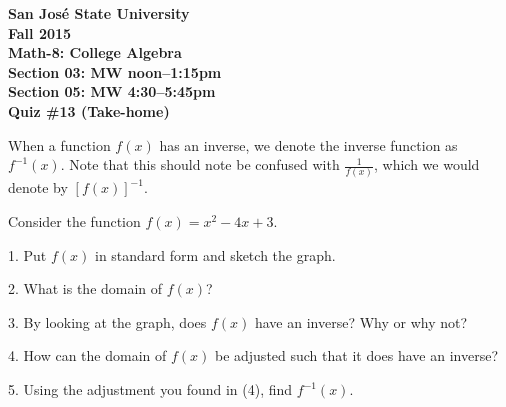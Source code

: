 \documentclass[letterpaper, 12pt]{article}
\begin{document}
\begin{center}
\bfseries
San Jos\'{e} State University \\
Fall 2015 \\
Math-8: College Algebra \\
Section 03: MW noon--1:15pm \\
Section 05: MW 4:30--5:45pm \\
\bigskip
Quiz \#13 (Take-home)
\end{center}

\bigskip

When a function $f(x)$ has an inverse, we denote the inverse function as
$f^{-1}(x)$. Note that this should note be confused with $\frac{1}{f(x)}$,
which we would denote by $[f(x)]^{-1}$.

\bigskip

Consider the function $f(x)=x^2-4x+3$.

\bigskip

1. Put $f(x)$ in standard form and sketch the graph.

\vspace{4in}

2. What is the domain of $f(x)$?

\vspace{1in}

3. By looking at the graph, does $f(x)$ have an inverse? Why or why not?

\vspace{1in}

4. How can the domain of $f(x)$ be adjusted such that it does have an inverse?

\vspace{1in}

5. Using the adjustment you found in (4), find $f^{-1}(x)$.
\end{document}

